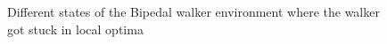 \begin{figure}[!ht]
    \centering
    \begin{subfigure}{.3\textwidth}
        \centering
    \end{subfigure}
    \hspace{1em}
    \begin{subfigure}{.3\textwidth}
        \centering
    \end{subfigure}
    \hspace{1em}
    \begin{subfigure}{.3\textwidth}
        \centering
    \end{subfigure}
    \caption{Different states of the Bipedal walker environment where the walker got stuck in local optima}
    \label{fig:bipedal_walker_local}
\end{figure}





 